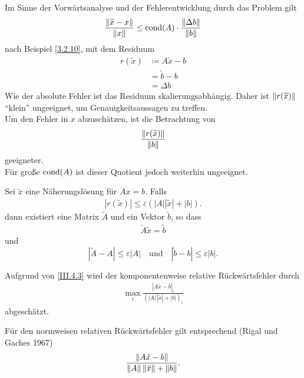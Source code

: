 Im Sinne der Vorwärtsanalyse und der Fehlerentwicklung durch das Problem gilt
\begin{gather*}
  \frac{\nn[\widetilde{x}-x]}{\nn[x]} \leq \Cond(A) \cdot \frac{\nn[\Delta b]}{\nn[b]}
\end{gather*}
nach Beispiel \ref{3.2.10}, 
mit dem Residuum 
\begin{align}
  r(\widetilde{x})  & \coloneqq A\widetilde{x} - b \label{III.4.1} \\ \nonumber 
                    &	= \widetilde{b}-b \\ \nonumber
                    & = \Delta b
\end{align}
Wie der absolute Fehler ist das Residuum skalierungsabhängig.
Daher ist $\nn[r(\widetilde{x})]$ \enquote{klein} ungeeignet, um
Genauigkeitsaussagen zu treffen. \\
Um den Fehler in $x$ abzuschätzen, ist die Betrachtung von 
\begin{gather}
  \frac{\nn[r(\widetilde{x})]}{\nn[b]} \label{III.4.2}
\end{gather}
geeigneter. \\
Für große $\Cond(A)$ ist dieser Quotient jedoch weiterhin ungeeignet.

\begin{Satze}\label{3.4.1}
  Sei $\tilde{ x}$ eine Näherungslösung für 
  $  A  x =  b$. 
  Falls
  \begin{gather}\label{III.4.3}
    |  r(\tilde { x})| \leq \varepsilon ( | A| | \tilde { x} | + |  b|).
  \end{gather}
  dann existiert eine Matrix $\tilde{ A}$  und ein
  Vektor $\tilde { b}$, so dass
  \begin{gather*}
    \tilde{ A} \tilde { x}  =  \tilde{ b} 
  \end{gather*}
  und
  \begin{equation}
    |\tilde{ A} -  A |  \leq  \varepsilon | A|
    \quad \textrm{und} \quad | \tilde{ b} -  b| \leq
    \varepsilon | b|.
    \label{III.4.4}
  \end{equation}
  
  Aufgrund von \eqref{III.4.3} wird der komponentenweise relative
  Rückwärtsfehler durch 
  \begin{gather*}
    \max_i \frac{|  A \tilde{ x} -  b|_i}
    { (| A|\, |\tilde{ x}| + | b|)_i} 
  \end{gather*}
  abgeschätzt.
  
  Für den normweisen relativen Rückwärtsfehler gilt entsprechend
  (Rigal und Gaches 1967)
  \begin{gather*}
    \frac{\nn[A \tilde{x} -  b]}
    { \nn[A] \nn[\tilde{x}] + \nn[b] } .
  \end{gather*}
\end{Satze}

